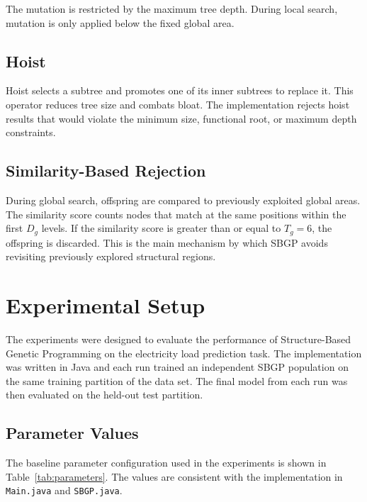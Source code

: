 \documentclass{article}
\begin{document}
The mutation is restricted by the maximum tree depth. During local search, mutation is only applied below the fixed global area.

\subsection{Hoist}

Hoist selects a subtree and promotes one of its inner subtrees to replace it. This operator reduces tree size and combats bloat. The implementation rejects hoist results that would violate the minimum size, functional root, or maximum depth constraints.

\subsection{Similarity-Based Rejection}

During global search, offspring are compared to previously exploited global areas. The similarity score counts nodes that match at the same positions within the first $D_g$ levels. If the similarity score is greater than or equal to $T_g = 6$, the offspring is discarded. This is the main mechanism by which SBGP avoids revisiting previously explored structural regions.

\section{Experimental Setup}

The experiments were designed to evaluate the performance of Structure-Based Genetic Programming on the electricity load prediction task. The implementation was written in Java and each run trained an independent SBGP population on the same training partition of the data set. The final model from each run was then evaluated on the held-out test partition.

\subsection{Parameter Values}

The baseline parameter configuration used in the experiments is shown in Table~\ref{tab:parameters}. The values are consistent with the implementation in \texttt{Main.java} and \texttt{SBGP.java}.
\end{document}
